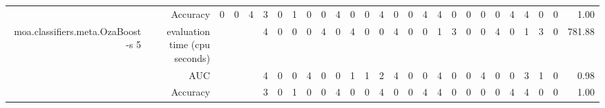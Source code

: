 \documentclass{article}
\providecommand{\tabularnewline}{\\}
\begin{document}
\begin{sidewaystable}
\begin{tabular}{|r|r|rrrrrrrr|r|r|r|r|r|r|r|r|r|r|r|r|r|r|r|r|r|}
 \cline{2-2} \cline{3-27}
 & Accuracy & \multicolumn{1}{r|}{0} & \multicolumn{1}{r|}{0} & \multicolumn{1}{r|}{4} & \multicolumn{1}{r|}{3} & \multicolumn{1}{r|}{0} & \multicolumn{1}{r|}{1} & \multicolumn{1}{r|}{0} & \multicolumn{1}{r|}{0} & \multicolumn{1}{r|}{4} & \multicolumn{1}{r|}{0} & \multicolumn{1}{r|}{0} & \multicolumn{1}{r|}{4} & \multicolumn{1}{r|}{0} & \multicolumn{1}{r|}{0} & \multicolumn{1}{r|}{4} & \multicolumn{1}{r|}{4} & \multicolumn{1}{r|}{0} & \multicolumn{1}{r|}{0} & \multicolumn{1}{r|}{0} & \multicolumn{1}{r|}{0} & \multicolumn{1}{r|}{4} & \multicolumn{1}{r|}{4} & \multicolumn{1}{r|}{0} & \multicolumn{1}{r|}{0} & 1.00\tabularnewline
 \cline{1-2} \cline{3-27}
\multirow{3}{*}{moa.classifiers.meta.OzaBoost -s 5} & evaluation time (cpu seconds) & \multicolumn{1}{r}{} & \multicolumn{1}{r}{} & \multicolumn{1}{r|}{} & \multicolumn{1}{r|}{4} & \multicolumn{1}{r|}{0} & \multicolumn{1}{r|}{0} & \multicolumn{1}{r|}{0} & \multicolumn{1}{r|}{4} & \multicolumn{1}{r|}{0} & \multicolumn{1}{r|}{4} & \multicolumn{1}{r|}{0} & \multicolumn{1}{r|}{0} & \multicolumn{1}{r|}{4} & \multicolumn{1}{r|}{0} & \multicolumn{1}{r|}{0} & \multicolumn{1}{r|}{1} & \multicolumn{1}{r|}{3} & \multicolumn{1}{r|}{0} & \multicolumn{1}{r|}{0} & \multicolumn{1}{r|}{4} & \multicolumn{1}{r|}{0} & \multicolumn{1}{r|}{1} & \multicolumn{1}{r|}{3} & \multicolumn{1}{r|}{0} & 781.88\tabularnewline
 \cline{2-2} \cline{6-27}
 & AUC & \multicolumn{1}{r}{} & \multicolumn{1}{r}{} & \multicolumn{1}{r|}{} & \multicolumn{1}{r|}{4} & \multicolumn{1}{r|}{0} & \multicolumn{1}{r|}{0} & \multicolumn{1}{r|}{4} & \multicolumn{1}{r|}{0} & \multicolumn{1}{r|}{0} & \multicolumn{1}{r|}{1} & \multicolumn{1}{r|}{1} & \multicolumn{1}{r|}{2} & \multicolumn{1}{r|}{4} & \multicolumn{1}{r|}{0} & \multicolumn{1}{r|}{0} & \multicolumn{1}{r|}{4} & \multicolumn{1}{r|}{0} & \multicolumn{1}{r|}{0} & \multicolumn{1}{r|}{4} & \multicolumn{1}{r|}{0} & \multicolumn{1}{r|}{0} & \multicolumn{1}{r|}{3} & \multicolumn{1}{r|}{1} & \multicolumn{1}{r|}{0} & 0.98\tabularnewline
 \cline{2-2} \cline{6-27}
 & Accuracy & \multicolumn{1}{r}{} & \multicolumn{1}{r}{} & \multicolumn{1}{r|}{} & \multicolumn{1}{r|}{3} & \multicolumn{1}{r|}{0} & \multicolumn{1}{r|}{1} & \multicolumn{1}{r|}{0} & \multicolumn{1}{r|}{0} & \multicolumn{1}{r|}{4} & \multicolumn{1}{r|}{0} & \multicolumn{1}{r|}{0} & \multicolumn{1}{r|}{4} & \multicolumn{1}{r|}{0} & \multicolumn{1}{r|}{0} & \multicolumn{1}{r|}{4} & \multicolumn{1}{r|}{4} & \multicolumn{1}{r|}{0} & \multicolumn{1}{r|}{0} & \multicolumn{1}{r|}{0} & \multicolumn{1}{r|}{0} & \multicolumn{1}{r|}{4} & \multicolumn{1}{r|}{4} & \multicolumn{1}{r|}{0} & \multicolumn{1}{r|}{0} & 1.00\tabularnewline

\end{tabular}
\end{sidewaystable}
\end{document}
